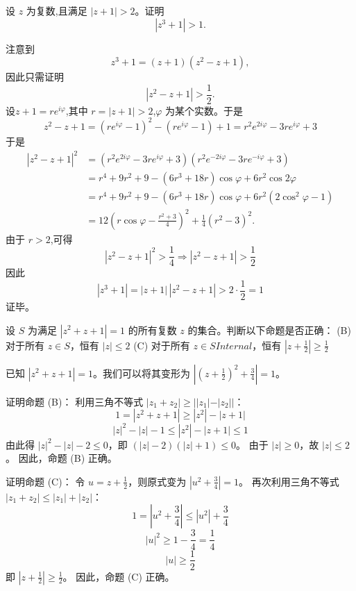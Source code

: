 \begin{questions}
    \question 设 $z$ 为复数,且满足 $|z+1|>2$。证明
    \[
    |z^3+1|>1.
    \]
    \begin{solution}
        注意到
        \[
        z^3+1=(z+1)(z^2-z+1),
        \]
        因此只需证明
        \[
        |z^2-z+1|> \frac{1}{2}.
        \]
        设$z+1=re^{i\varphi}$,其中 $r=|z+1|>2$,$\varphi$ 为某个实数。于是
        \[
        z^2-z+1=(re^{i\varphi}-1)^2-(re^{i\varphi}-1)+1 =r^2e^{2i\varphi}-3re^{i\varphi}+3
        \]
        于是
        \begin{align*}
        |z^2-z+1|^2
        &=(r^2e^{2i\varphi}-3re^{i\varphi}+3)
        (r^2e^{-2i\varphi}-3re^{-i\varphi}+3) \\
        &=r^4+9r^2+9-(6r^3+18r)\cos\varphi+6r^2\cos 2\varphi \\
        &=r^4+9r^2+9-(6r^3+18r)\cos\varphi+6r^2(2\cos^2\varphi-1) \\
        &=12\left(r\cos\varphi-\frac{r^2+3}{4}\right)^2
        +\frac{1}{4}(r^2-3)^2.
        \end{align*}
        由于 $r>2$,可得
        \[
        |z^2-z+1|^2>\frac{1}{4}\Rightarrow |z^2-z+1|>\frac{1}{2}
        \]
        因此
        \[
        |z^3+1|=|z+1|\,|z^2-z+1|>2\cdot\frac{1}{2}=1
        \]
        证毕。
    \end{solution}

    \question
设 $S$ 为满足 $|z^2 + z + 1| = 1$ 的所有复数 $z$ 的集合。判断以下命题是否正确：
(B) 对于所有 $z \in S$，恒有 $|z| \le 2$
(C) 对于所有 $z \in SInternal$，恒有 $|z + \frac{1}{2}| \ge \frac{1}{2}$

\begin{solution}
已知 $|z^2 + z + 1| = 1$。我们可以将其变形为 $|(z + \frac{1}{2})^2 + \frac{3}{4}| = 1$。

证明命题 (B)：
利用三角不等式 $|z_1 + z_2| \ge ||z_1| - |z_2||$：
\[ 1 = |z^2 + z + 1| \ge |z^2| - |z + 1| \]
\[ |z|^2 - |z| - 1 \le |z^2| - |z + 1| \le 1 \]
由此得 $|z|^2 - |z| - 2 \le 0$，即 $(|z| - 2)(|z| + 1) \le 0$。
由于 $|z| \ge 0$，故 $|z| \le 2$。
因此，命题 (B) 正确。

证明命题 (C)：
令 $u = z + \frac{1}{2}$，则原式变为 $|u^2 + \frac{3}{4}| = 1$。
再次利用三角不等式 $|z_1 + z_2| \le |z_1| + |z_2|$：
\[ 1 = |u^2 + \frac{3}{4}| \le |u^2| + \frac{3}{4} \]
\[ |u|^2 \ge 1 - \frac{3}{4} = \frac{1}{4} \]
\[ |u| \ge \frac{1}{2} \]
即 $|z + \frac{1}{2}| \ge \frac{1}{2}$。
因此，命题 (C) 正确。
\end{solution}


\end{questions}
